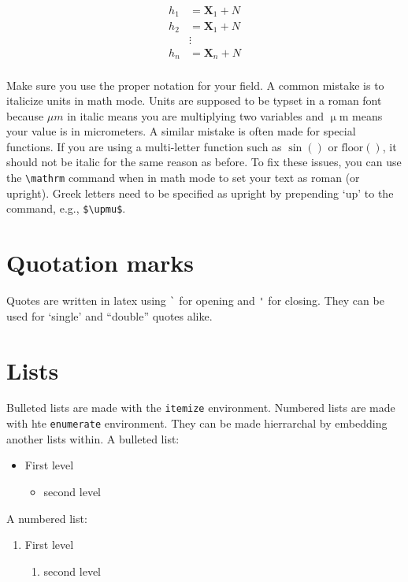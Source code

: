 \begin{align*}
	h_1 &= \mathbf{X}_1 + N \\
	h_2 &= \mathbf{X}_1 + N \\
	&\vdots \\
	h_n &= \mathbf{X}_n + N \\
\end{align*}

Make sure you use the proper notation for your field. A common mistake is to italicize units in math mode. Units are supposed to be typset in a roman font because $\mu m$ in italic means you are multiplying two variables and $\mathrm{\upmu m}$ means your value is in micrometers. A similar mistake is often made for special functions. If you are using a multi-letter function such as $\sin()$ or $\mathrm{floor}()$, it should not be italic for the same reason as before. To fix these issues, you can use the \texttt{\textbackslash mathrm} command when in math mode to set your text as roman (or upright). Greek letters need to be specified as upright by prepending `up' to the command, e.g., \texttt{\$\textbackslash upmu\$}.

\section*{Quotation marks}
Quotes are written in latex using \texttt{\`} for opening and \texttt{\'} for closing. They can be used for `single' and ``double'' quotes alike.

\section*{Lists}
Bulleted lists are made with the \texttt{itemize} environment. Numbered lists are made with hte \texttt{enumerate} environment. They can be made hierrarchal by embedding another lists within. A bulleted list:
\begin{itemize}
	\item First level
	\begin{itemize}
		\item second level
	\end{itemize}
\end{itemize}
A numbered list:
\begin{enumerate}
	\item First level
	\begin{enumerate}
		\item second level
	\end{enumerate}
\end{enumerate}

